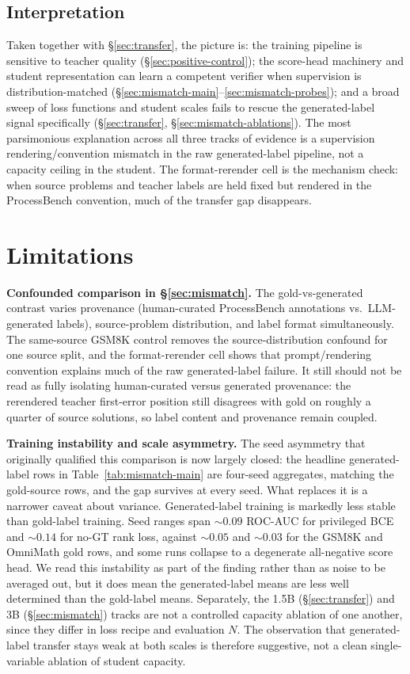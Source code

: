 \documentclass{article}
\begin{document}
\subsection{Interpretation}
Taken together with \S\ref{sec:transfer}, the picture is: the training
pipeline is sensitive to teacher quality (\S\ref{sec:positive-control}); the
score-head machinery and student representation can learn a competent
verifier when supervision is distribution-matched
(\S\ref{sec:mismatch-main}--\ref{sec:mismatch-probes}); and a broad sweep of
loss functions and student scales fails to rescue the generated-label
signal specifically (\S\ref{sec:transfer}, \S\ref{sec:mismatch-ablations}).
The most parsimonious explanation across all three tracks of evidence is a
supervision rendering/convention mismatch in the raw generated-label pipeline,
not a capacity ceiling in the student. The format-rerender cell is the
mechanism check: when source problems and teacher labels are held fixed but
rendered in the ProcessBench convention, much of the transfer gap disappears.

\section{Limitations}
\label{sec:limitations}

\textbf{Confounded comparison in \S\ref{sec:mismatch}.} The gold-vs-generated
contrast varies provenance (human-curated ProcessBench annotations vs.\
LLM-generated labels), source-problem distribution, and label format
simultaneously. The same-source GSM8K control removes the source-distribution
confound for one source split, and the format-rerender cell shows that
prompt/rendering convention explains much of the raw generated-label failure.
It still should not be read as fully isolating human-curated versus generated
provenance: the rerendered teacher first-error position still disagrees with
gold on roughly a quarter of source solutions, so label content and provenance
remain coupled.

\textbf{Training instability and scale asymmetry.} The seed asymmetry that
originally qualified this comparison is now largely closed: the headline
generated-label rows in Table~\ref{tab:mismatch-main} are four-seed
aggregates, matching the gold-source rows, and the gap survives at every
seed. What replaces it is a narrower caveat about variance. Generated-label
training is markedly less stable than gold-label training. Seed ranges span
$\sim$$0.09$ ROC-AUC for privileged BCE and $\sim$$0.14$ for no-GT rank loss,
against $\sim$$0.05$ and $\sim$$0.03$ for the GSM8K and OmniMath gold rows,
and some runs collapse to a degenerate all-negative score head. We read this
instability as part of the finding rather than as noise to be averaged out,
but it does mean the generated-label means are less well determined than the
gold-label means. Separately, the 1.5B (\S\ref{sec:transfer})
and 3B (\S\ref{sec:mismatch}) tracks are not a controlled capacity ablation
of one another, since they differ in loss recipe and evaluation $N$. The
observation that generated-label transfer stays weak at both scales is
therefore suggestive, not a clean single-variable ablation of student
capacity.
\end{document}
